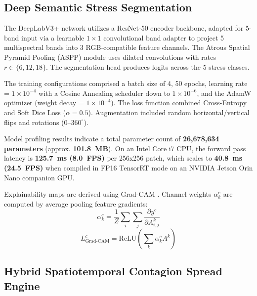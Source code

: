\documentclass[review,3p,times,authoryear]{elsarticle}
\begin{document}
\subsection{Deep Semantic Stress Segmentation}
The DeepLabV3+ \citep{chen2018deeplab} network utilizes a ResNet-50 encoder backbone, adapted for 5-band input via a learnable $1 \times 1$ convolutional band adapter to project 5 multispectral bands into 3 RGB-compatible feature channels. The Atrous Spatial Pyramid Pooling (ASPP) module uses dilated convolutions with rates $r \in \{6, 12, 18\}$. The segmentation head produces logits across the 5 stress classes. 

The training configurations comprised a batch size of 4, 50 epochs, learning rate = $1 \times 10^{-4}$ with a Cosine Annealing scheduler down to $1 \times 10^{-6}$, and the AdamW optimizer (weight decay = $1 \times 10^{-4}$). The loss function combined Cross-Entropy and Soft Dice Loss ($\alpha = 0.5$). Augmentation included random horizontal/vertical flips and rotations ($0\text{--}360^\circ$).

Model profiling results indicate a total parameter count of \textbf{26,678,634 parameters} (approx. \textbf{101.8~MB}). On an Intel Core i7 CPU, the forward pass latency is \textbf{125.7~ms (8.0~FPS)} per 256x256 patch, which scales to \textbf{40.8~ms (24.5~FPS)} when compiled in FP16 TensorRT mode on an NVIDIA Jetson Orin Nano companion GPU.

Explainability maps are derived using Grad-CAM \citep{selvaraju2017gradcam}. Channel weights $\alpha_k^c$ are computed by average pooling feature gradients:
\begin{equation}
\alpha_k^c = \frac{1}{Z} \sum_{i} \sum_{j} \frac{\partial y^c}{\partial A^k_{i,j}}
\end{equation}
\begin{equation}
L^c_\text{Grad-CAM} = \text{ReLU}\!\left(\sum_{k} \alpha_k^c A^k\right)
\end{equation}

\subsection{Hybrid Spatiotemporal Contagion Spread Engine}
\end{document}
